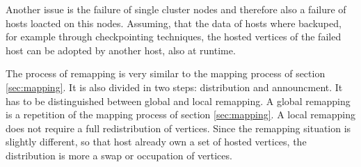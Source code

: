 Another issue is the failure of single cluster nodes and therefore
also a failure of hosts loacted on this nodes. Assuming, that the data
of hosts where backuped, for example through checkpointing techniques,
the hosted vertices of the failed host can be adopted by another host,
also at runtime.

The process of remapping is very similar to the mapping process of
section \ref{sec:mapping}.  It is also divided in two steps:
distribution and announcment. It has to be distinguished between
global and local remapping. A global remapping is a repetition of the
mapping process of section \ref{sec:mapping}. A local remapping does
not require a full redistribution of vertices.  Since the remapping
situation is slightly different, so that host already own a set of
hosted vertices, the distribution is more a swap or occupation of
vertices. 

\cleardoublepage

